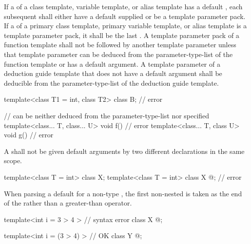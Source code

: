 \pnum
If a
of a class template, variable template, or alias template has a default
,
each subsequent
shall either have a default
supplied
or be a template parameter pack. If a 
of a primary class template, primary variable template, or alias template
is a template parameter pack, it shall be the last
.
A template parameter pack of a function template shall not be followed by
another
template parameter unless that template parameter can be deduced from the
parameter-type-list of the function template or has a
default argument.
A template parameter of a deduction guide template
that does not have a default argument
shall be deducible
from the parameter-type-list
of the deduction guide template.
\begin{example}

\begin{codeblock}
template<class T1 = int, class T2> class B;     // error

//  can be neither deduced from the parameter-type-list nor specified
template<class... T, class... U> void f() { }   // error
template<class... T, class U> void g() { }      // error
\end{codeblock}
\end{example}

\pnum
A
shall
not be given default arguments by two different declarations in the same scope.
\begin{example}

\begin{codeblock}
template<class T = int> class X;
template<class T = int> class X { @\commentellip@ };  // error
\end{codeblock}
\end{example}

%
\pnum
When parsing a
default
for a non-type
,
the first non-nested
\tcode{>}
is taken as the end of the
rather than a greater-than operator.
\begin{example}

\begin{codeblock}
template<int i = 3 > 4 >        // syntax error
class X { @\commentellip@ };

template<int i = (3 > 4) >      // OK
class Y { @\commentellip@ };
\end{codeblock}
\end{example}

